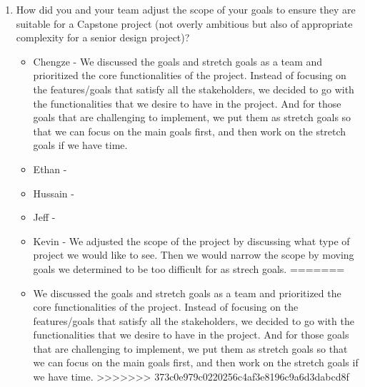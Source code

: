 \documentclass{article}
\begin{document}
\begin{enumerate}
    \item How did you and your team adjust the scope of your goals to ensure
    they are suitable for a Capstone project (not overly ambitious but also of
    appropriate complexity for a senior design project)?
    \begin{itemize}
<<<<<<< HEAD
        \item Chengze - We discussed the goals and stretch goals 
        as a team and prioritized the core functionalities of the 
        project. Instead of focusing on the features/goals that 
        satisfy all the stakeholders, we decided to go with the 
        functionalities that we desire to have in the project. 
        And for those goals that are challenging to implement, 
        we put them as stretch goals so that we can focus on the 
        main goals first, and then work on the stretch goals if 
        we have time.
        \item Ethan - 
        \item Hussain -
        \item Jeff - 
        \item Kevin - We adjusted the scope of the project by discussing what 
        type of project we would like to see. Then we would narrow the scope 
        by moving goals we determined to be too difficult for as strech goals. 
=======
        \item We discussed the goals and stretch goals as a team
        and prioritized the core functionalities of the project.
        Instead of focusing on the features/goals that satisfy all 
        the stakeholders, we decided to go with the functionalities that
        we desire to have in the project. And for those goals that are 
        challenging to implement, we put them as stretch goals so that 
        we can focus on the main goals first, and then work on the 
        stretch goals if we have time.
>>>>>>> 373c0e979c0220256c4af3e8196c9a6d3dabcd8f
    \end{itemize}
\end{enumerate}  
\end{document}
